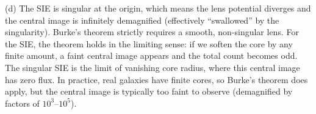 (d) The SIE is singular at the origin, which means the lens
potential diverges and the central image is infinitely demagnified
(effectively ``swallowed'' by the singularity).  Burke's theorem
strictly requires a smooth, non-singular lens.  For the SIE, the
theorem holds in the limiting sense: if we soften the core by any
finite amount, a faint central image appears and the total count
becomes odd.  The singular SIE is the limit of vanishing core
radius, where this central image has zero flux.  In practice, real
galaxies have finite cores, so Burke's theorem does apply, but the
central image is typically too faint to observe (demagnified by
factors of $10^3$--$10^5$).
